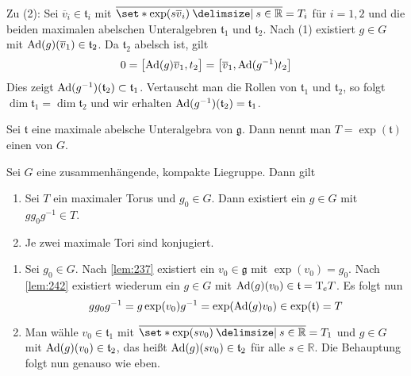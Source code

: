 \begin{beweis}
	Zu (2): Sei $\overline{v}_i \in \mathfrak{t}_i$ mit $\overline{\set*{\exp(s \overline{v}_i) \given s \in \mathbb{R}}} = T_i$ für $i=1,2$ und die beiden maximalen abelschen Unteralgebren $\mathfrak{t}_1$ und $\mathfrak{t}_2$.
	Nach (1) existiert $g \in G$ mit $\Ad(g)(\overline{v}_1) \in \mathfrak{t}_2$.
	Da $\mathfrak{t}_2$ abelsch ist, gilt
	\[
		0 = \benbrace[\big]{\Ad(g) \overline{v}_1, t_2} = \benbrace*{\overline{v}_1, \Ad(g^{-1}) t_2}
	\]
	Dies zeigt $\Ad(g^{-1})(\mathfrak{t}_2) \subset \mathfrak{t}_1$.
	Vertauscht man die Rollen von $\mathfrak{t}_1$ und $\mathfrak{t}_2$, so folgt $\dim \mathfrak{t}_1 = \dim \mathfrak{t}_2$ und wir erhalten $\Ad(g^{-1})(\mathfrak{t}_2) = \mathfrak{t}_1$.
\end{beweis}

\begin{definition}[{name=[maximaler Torus einer Liegruppe]}]
	Sei $\mathfrak{t}$ eine maximale abelsche Unteralgebra von $\mathfrak{g}$.
	Dann nennt man $T= \exp(\mathfrak{t})$ einen  von $G$. 
\end{definition}

\begin{satz}[{name=[maximale Tori sind konjugiert]},label=satz:244]
	Sei $G$ eine zusammenhängende, kompakte Liegruppe.
	Dann gilt
	\begin{enumerate}[(1)]
		\item Sei $T$ ein maximaler Torus und $g_0 \in G$.
		Dann existiert ein $g \in G$ mit $g g_0 g^{-1} \in T$.
		\item Je zwei maximale Tori sind konjugiert.
	\end{enumerate}
\end{satz}
\begin{beweis}
	\begin{enumerate}[(1)]
		\item Sei $g_0 \in G$.
		Nach \autoref{lem:237} existiert ein $v_0 \in \mathfrak{g}$ mit $\exp(v_0)= g_0$.
		Nach \autoref{lem:242} existiert wiederum ein $g \in G$ mit $\Ad(g)(v_0) \in \mathfrak{t} = \Tmap_e T$.
		Es folgt nun
		\[
			g g_0 g^{-1} = g \exp(v_0) g^{-1} = \exp \enbrace*{\Ad(g) v_0} \in \exp(\mathfrak{t}) = T
		\]
		\item Man wähle $v_0 \in \mathfrak{t}_1$ mit $\overline{\set*{\exp(s v_0) \given s \in \mathbb{R}}} =T_1$ und $g \in G$ mit $\Ad(g)(v_0) \in \mathfrak{t}_2$, das heißt $\Ad(g)(s v_0) \in \mathfrak{t}_2$ für alle $s \in \mathbb{R}$.
		Die Behauptung folgt nun genauso wie eben.\qedhere
	\end{enumerate}
\end{beweis}

